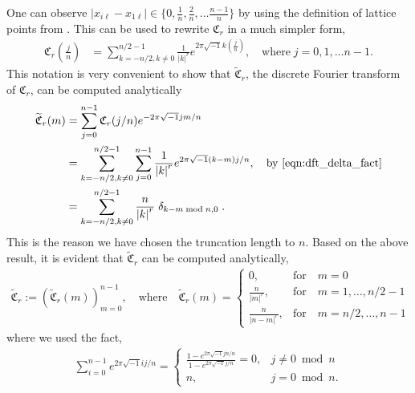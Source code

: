 \documentclass{svjour3}                     %
\newcommand{\bm}[1]{\boldsymbol{#1}}
\def\abs#1{\ensuremath{\left \lvert #1 \right \rvert}}
\begin{document}
One can observe
$\abs{x_{i\ell}-x_{1\ell}} \in \lbrace 0, \frac 1n, \frac 2n, \dots \frac{n-1}{n}  \rbrace$ by using the definition of lattice points from \cite{JagThesis19a}. %
This can be used to rewrite $\mathfrak{C}_r$ in a much simpler form,
\begin{align*}
\mathfrak{C}_r \left(\frac jn \right) &= \sum_{k = - n/2, k \neq 0 }^{n/2 - 1} \frac{1}{\abs{k}^r} 
e^{ 2 \pi\sqrt{-1} k (\frac jn)}, \quad \text{where} \;  j=0,1,\dots n-1.
\end{align*}
This notation is very convenient to show that $\widetilde{\mathfrak{C}}_r$,  the discrete Fourier transform of $\mathfrak{C}_r$, can be computed analytically
\begin{align*}
\widetilde{\mathfrak{C}}_r(m) &= \sum_{j=0}^{n-1} \mathfrak{C}_r (j/n) e^{- 2 \pi\sqrt{-1} jm/n} 
\\
&= \sum_{k = - n/2, k \neq 0 }^{n/2-1} 
\sum_{j=0}^{n-1} \frac{1}{\abs{k}^r} e^{ 2 \pi\sqrt{-1} (k-m)  j/n} , \quad \text{by \eqref{eqn:dft_delta_fact}}
\\
&= \sum_{k = - n/2, k \neq 0  }^{n/2-1} \frac{n}{\abs{k}^r} \; \delta_{k-m \bmod n, 0} \; .
\end{align*}
This is the reason we have chosen the truncation length to $n$. 
Based on the above result, it is evident that $\widetilde{\mathfrak{C}}_r$ can be computed analytically,
\begin{align} \label{dft_of_g}
\widetilde{\bm{\mathfrak{C}}}_r := \left(\widetilde{\mathfrak{C}}_{r}(m)\right)_{m=0}^{n-1}, \quad
\text{where} \quad
\widetilde{\mathfrak{C}}_r(m) = 
\begin{cases}
0, & \text{for} \quad m=0 \\
\frac{n}{\abs{m}^r}, & \text{for} \quad m=1,\dots,n/2-1 \\
\frac{n}{\abs{n-m}^r}, & \text{for} \quad m=n/2,\dots,n-1
\end{cases}
\end{align}
where we used the fact,
\begin{align}
\label{eqn:dft_delta_fact}
\sum_{i=0}^{n-1} e^{2 \pi \sqrt{-1} i j /n} = 
\begin{cases}
\frac{1 - e^{2\pi \sqrt{-1} j n /n}}{1 - e^{2\pi \sqrt{-1} j /n}} = 0, &j \ne 0 \bmod n
\\
n, & j = 0 \bmod n.
\end{cases}
\end{align}
\end{document}
